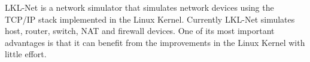 
LKL-Net is a network simulator that simulates network devices using the TCP/IP stack implemented in the Linux Kernel. Currently LKL-Net simulates host, router, switch, NAT and firewall devices. One of its most important advantages is that it can benefit from the improvements in the Linux Kernel with little effort.
